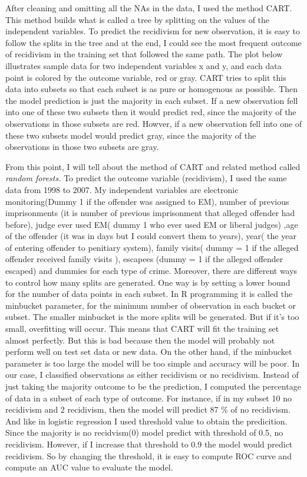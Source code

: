 \documentclass[a4paper,12pt]{article}
\begin{document}
After cleaning and omitting all the NAs in the data, I used the method CART. This method builds what is called a tree by splitting on the values of the independent variables. To predict the recidivism for new observation, it is easy to follow the splits in the tree and at the end, I could see the most frequent outcome of recidivism in the training set that followed the same path. 
The plot below illustrates sample data for two independent variables x and y, and each data point is colored by the outcome variable, red or gray. CART tries to split this data into subsets so that each subset is as pure or homogenous as possible. Then the model prediction is just the majority in each subset. If a new observation fell into one of these two subsets then it would predict red, since the majority of the observations in those subsets are red. Howver, if a new observation fell into one of these two subsets model would predict gray, since the majority of the observations in those two subsets are gray. 

From this point, I will tell about the method of CART and related method called \textit{random forests.} To predict the outcome variable (recidivism), I used the same data from 1998 to 2007. My independent variables are electronic monitoring(Dummy 1 if the offender was assigned to EM), number of previous imprisonments (it is number of previous imprisonment that alleged offender had before), judge ever used EM( dummy 1 who ever used EM or liberal judges) ,age of the offender (it was in days but I could convert them to years), year( the year of entering offender to penitiary system), family visits( dummy = 1 if the alleged offender received family visits ), escapees (dummy = 1 if the alleged offender escaped) and dummies for each type of crime. Moreover, there are different ways to control how many splits are generated. One way is by setting a lower bound for the number of data points in each subset. In R programming it is called the minbucket parameter, for the minimum number of observation in each bucket or subset. The smaller minbucket is the more splits will be generated. But if it's too small, overfitting will occur. This means that CART will fit the training set almost perfectly. But this is bad because then the model will probably not perform well on test set data or new data. On the other hand, if the minbucket parameter is too large the model will be too simple and accuracy will be poor. In our case, I classified observations as either recidivism or no recidivism. Instead of just taking the majority outcome to be the prediction, I  computed the percentage of data in a subset of each type of outcome. For instance, if in my subset 10 no recidivism and 2 recidivism, then the model will predict 87 \% of no recidivism. And like in logistic regression I used threshold value to obtain the predicition.  Since the majority is no recidvism(0) model predict with threshold of 0.5, no recidivism. However, if I increase that threshold to 0.9 the model would predict recidivism. So by changing the threshold, it is easy to compute ROC curve and compute an AUC value to evaluate the model. 
\end{document}
